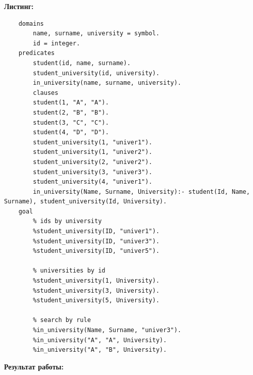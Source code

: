 \documentclass[12pt, a4paper]{extarticle}
\begin{document}
\newpage
\textbf{Листинг:}
\begin{lstlisting}
	domains
		name, surname, university = symbol.
		id = integer.	
	predicates
		student(id, name, surname).
		student_university(id, university).
		in_university(name, surname, university).
		clauses
		student(1, "A", "A").
		student(2, "B", "B").
		student(3, "C", "C").
		student(4, "D", "D").	
		student_university(1, "univer1").
		student_university(1, "univer2").
		student_university(2, "univer2").
		student_university(3, "univer3").
		student_university(4, "univer1").
		in_university(Name, Surname, University):- student(Id, Name, Surname), student_university(Id, University).	
	goal
		% ids by university
		%student_university(ID, "univer1"). 
		%student_university(ID, "univer3"). 
		%student_university(ID, "univer5").
		
		% universities by id
		%student_university(1, University).
		%student_university(3, University).
		%student_university(5, University). 
		
		% search by rule
		%in_university(Name, Surname, "univer3").
		%in_university("A", "A", University).
		%in_university("A", "B", University). 
\end{lstlisting}

\textbf{Результат работы:}\par
\end{document}

